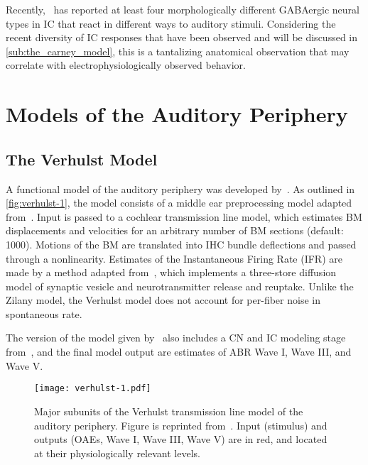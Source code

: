 Recently,~\cite{Beebe2016Extracellular} has reported at least four morphologically different GABAergic neural types in IC that react in different ways to auditory stimuli.  Considering the recent diversity of IC responses that have been observed and will be discussed in \autoref{sub:the_carney_model}, this is a tantalizing anatomical observation that may correlate with electrophysiologically observed behavior.  



\section{Models of the Auditory Periphery} %
\label{sec:models_of_the_auditory_periphery}
\subsection{The Verhulst Model} %
\label{sub:the_verhulst_model}
A functional model of the auditory periphery was developed by~\cite{Verhulst2015Functional}.  As outlined in \autoref{fig:verhulst-1}, the model consists of a middle ear preprocessing model adapted from~\cite{Meddis2010Computational}.  Input is passed to a cochlear transmission line model, which estimates BM displacements and velocities for an arbitrary number of BM sections (default: 1000).  Motions of the BM are translated into IHC bundle deflections and passed through a nonlinearity.  Estimates of the Instantaneous Firing Rate (IFR) are made by a method adapted from~\cite{Westerman1988Diffusion}, which implements a three-store diffusion model of synaptic vesicle and neurotransmitter release and reuptake.  Unlike the Zilany model, the Verhulst model does not account for per-fiber noise in spontaneous rate.

The version of the model given by~\cite{Verhulst2015Functional} also includes a CN and IC modeling stage from~\cite{Nelson2004Phenomenological}, and the final model output are estimates of ABR Wave I, Wave III, and Wave V. 

\begin{figure}[htbp]
	\centering
	\texttt{[image: verhulst-1.pdf]}
	\caption[The Verhulst Model]{Major subunits of the Verhulst transmission line model of the auditory periphery.  Figure is reprinted from~\cite{Verhulst2015Functional}.  Input (stimulus) and outputs (OAEs, Wave I, Wave III, Wave V) are in red, and located at their physiologically relevant levels.}
	\label{fig:verhulst-1}
\end{figure}



